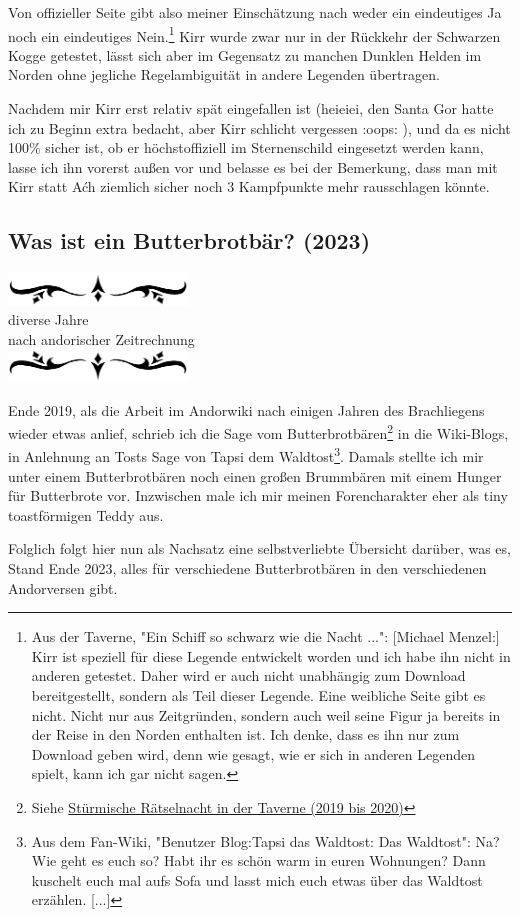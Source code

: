 \documentclass[10pt, a4paper, oneside]{book}
\newcommand{\hypref}[1]{%
    \hyperref[#1]{#1}%
}
\newcommand{\az}[1]{%
    \begin{center}
        \includegraphics[width=180px]{Das Erbe des Wunderkindes/verzierung1.png}\\
        {\Huge #1} \\
        {nach andorischer Zeitrechnung}\\
        \includegraphics[width=180px]{Das Erbe des Wunderkindes/verzierung2.png}
    \end{center}
    \extramarks{}{#1 a.Z.}
}
\begin{document}
{Von offizieller Seite gibt also meiner Einschätzung nach weder ein eindeutiges Ja noch ein eindeutiges Nein.\footnote{Aus der Taverne, "Ein Schiff so schwarz wie die Nacht ...": [Michael Menzel:] Kirr ist speziell für diese Legende entwickelt worden und ich habe ihn nicht in anderen getestet. Daher wird er auch nicht unabhängig zum Download bereitgestellt, sondern als Teil dieser Legende. Eine weibliche Seite gibt es nicht. Nicht nur aus Zeitgründen, sondern auch weil seine Figur ja bereits in der Reise in den Norden enthalten ist. Ich denke, dass es ihn nur zum Download geben wird, denn wie gesagt, wie er sich in anderen Legenden spielt, kann ich gar nicht sagen.} Kirr wurde zwar nur in der Rückkehr der Schwarzen Kogge getestet, lässt sich aber im Gegensatz zu manchen Dunklen Helden im Norden ohne jegliche Regelambiguität in andere Legenden übertragen.



Nachdem mir Kirr erst relativ spät eingefallen ist (heieiei, den Santa Gor hatte ich zu Beginn extra bedacht, aber Kirr schlicht vergessen :oops: ), und da es nicht 100\% sicher ist, ob er höchstoffiziell im Sternenschild eingesetzt werden kann, lasse ich ihn vorerst außen vor und belasse es bei der Bemerkung, dass man mit Kirr statt Aćh ziemlich sicher noch 3 Kampfpunkte mehr rausschlagen könnte.

}










\begin{chapterbox}
    \chapter{Was ist ein Butterbrotbär? (2023)}
    \label{Was ist ein Butterbrotbär? (2023)}
    \az{diverse Jahre}
    
    Ende 2019, als die Arbeit im Andorwiki nach einigen Jahren des Brachliegens wieder etwas anlief, schrieb ich die Sage vom Butterbrotbären\footnote{Siehe \hypref{Stürmische Rätselnacht in der Taverne (2019 bis 2020)}} in die Wiki-Blogs, in Anlehnung an Tosts Sage von Tapsi dem Waldtost\footnote{Aus dem Fan-Wiki, "Benutzer Blog:Tapsi das Waldtost: Das Waldtost": Na? Wie geht es euch so? Habt ihr es schön warm in euren Wohnungen? Dann kuschelt euch mal aufs Sofa und lasst mich euch etwas über das Waldtost erzählen. [...]}. Damals stellte ich mir unter einem Butterbrotbären noch einen großen Brummbären mit einem Hunger für Butterbrote vor. Inzwischen male ich mir meinen Forencharakter eher als tiny toastförmigen Teddy aus.

    Folglich folgt hier nun als Nachsatz eine selbstverliebte Übersicht darüber, was es, Stand Ende 2023, alles für verschiedene Butterbrotbären in den verschiedenen Andorversen gibt.
\end{chapterbox}
\end{document}
